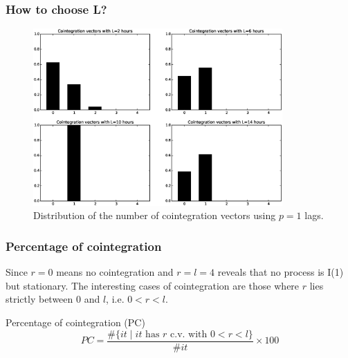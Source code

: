 \documentclass{beamer}
\begin{document}
\begin{frame}
\frametitle{How to choose L?}
  \begin{figure}[!h]
  \centering
   \includegraphics[width=0.85\textwidth]{img/51_Fig1}
  \caption[Distribution of the number of cointegration vectors using $p=1$ lags]{Distribution of the number of cointegration vectors using $p=1$ lags.}
  \label{fig:hists}
\end{figure}
\end{frame}


\begin{frame}
\frametitle{Percentage of cointegration}
Since $r=0$ means no cointegration and $r=l=4$ reveals that no process is I(1) but stationary.
The interesting cases of cointegration are those where $r$ lies strictly
between $0$ and $l$, i.e. $0<r<l$.
\vspace{5mm}
\begin{block}{Percentage of cointegration (PC)}
{\color{blue}
\begin{equation*} \label{eq:pcoint}
PC = 
\frac{\#\{ it \mid \text{$it$ has $r$ c.v. with $0<r<l$}\}}
     {\#it}\times 100
\end{equation*}}
\end{block}
\end{frame}
\end{document}
